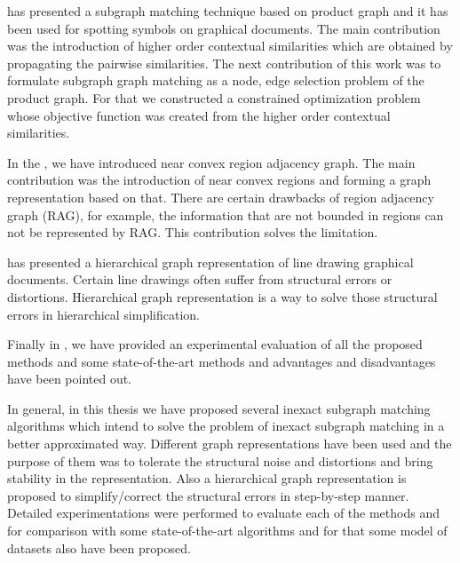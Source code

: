  has presented a subgraph matching technique based on product graph and it has been used for spotting symbols on graphical documents. The main contribution was the introduction of higher order contextual similarities which are obtained by propagating the pairwise similarities. The next contribution of this work was to formulate subgraph graph matching as a node, edge selection problem of the product graph. For that we constructed a constrained optimization problem whose objective function was created from the higher order contextual similarities.

In the , we have introduced near convex region adjacency graph. The main contribution was the introduction of near convex regions and forming a graph representation based on that. There are certain drawbacks of region adjacency graph (RAG), for example, the information that are not bounded in regions can not be represented by RAG. This contribution solves the limitation.

 has presented a hierarchical graph representation of line drawing graphical documents. Certain line drawings often suffer from structural errors or distortions. Hierarchical graph representation is a way to solve those structural errors in hierarchical simplification.

Finally in , we have provided an experimental evaluation of all the proposed methods and some state-of-the-art methods and advantages and disadvantages have been pointed out.

In general, in this thesis we have proposed several inexact subgraph matching algorithms which intend to solve the problem of inexact subgraph matching in a better approximated way. Different graph representations have been used and the purpose of them was to tolerate the structural noise and distortions and bring stability in the representation. Also a hierarchical graph representation is proposed to simplify/correct the structural errors in step-by-step manner. Detailed experimentations were performed to evaluate each of the methods and for comparison with some state-of-the-art algorithms and for that some model of datasets also have been proposed.
